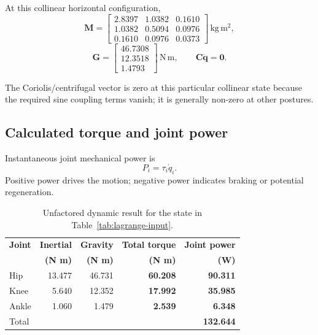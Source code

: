 \documentclass[11pt,a4paper]{article}
\newcommand{\unit}[1]{\ensuremath{\,\mathrm{#1}}}
\newcommand{\Nm}{\unit{N\,m}}
\begin{document}
At this collinear horizontal configuration,
\begin{equation}
\mathbf M=
\begin{bmatrix}
2.8397 & 1.0382 & 0.1610\\
1.0382 & 0.5094 & 0.0976\\
0.1610 & 0.0976 & 0.0373
\end{bmatrix}\unit{kg\,m^2},
\end{equation}
\begin{equation}
\mathbf G=
\begin{bmatrix}46.7308\\12.3518\\1.4793\end{bmatrix}\Nm,
\qquad
\mathbf C\dot{\mathbf q}=\mathbf 0.
\end{equation}

The Coriolis/centrifugal vector is zero at this particular collinear state because the required sine coupling terms vanish; it is generally non-zero at other postures.

\subsection{Calculated torque and joint power}

Instantaneous joint mechanical power is
\begin{equation}
  \boxed{P_i=\tau_i\dot q_i.}
\end{equation}
Positive power drives the motion; negative power indicates braking or potential regeneration.

\begin{table}[H]
\centering
\caption{Unfactored dynamic result for the state in Table~\ref{tab:lagrange-input}.}
\label{tab:lagrange-result}
\small
\begin{tabular}{@{}lrrrr@{}}
\toprule
\textbf{Joint} & \textbf{Inertial} & \textbf{Gravity} & \textbf{Total torque} & \textbf{Joint power} \\
& \textbf{(N m)} & \textbf{(N m)} & \textbf{(N m)} & \textbf{(W)} \\
\midrule
Hip & 13.477 & 46.731 & \textbf{60.208} & \textbf{90.311} \\
Knee & 5.640 & 12.352 & \textbf{17.992} & \textbf{35.985} \\
Ankle & 1.060 & 1.479 & \textbf{2.539} & \textbf{6.348} \\
\midrule
Total & & & & \textbf{132.644} \\
\bottomrule
\end{tabular}
\end{table}
\end{document}
